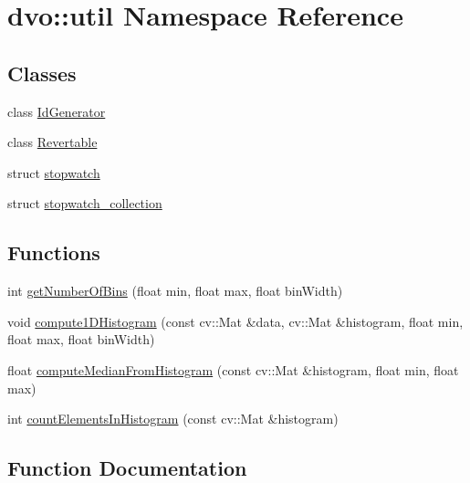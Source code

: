 \hypertarget{namespacedvo_1_1util}{}\section{dvo\+:\+:util Namespace Reference}
\label{namespacedvo_1_1util}
\subsection*{Classes}
\begin{DoxyCompactItemize}
\item 
class \mbox{\hyperlink{classdvo_1_1util_1_1_id_generator}{Id\+Generator}}
\item 
class \mbox{\hyperlink{classdvo_1_1util_1_1_revertable}{Revertable}}
\item 
struct \mbox{\hyperlink{structdvo_1_1util_1_1stopwatch}{stopwatch}}
\item 
struct \mbox{\hyperlink{structdvo_1_1util_1_1stopwatch__collection}{stopwatch\+\_\+collection}}
\end{DoxyCompactItemize}
\subsection*{Functions}
\begin{DoxyCompactItemize}
\item 
int \mbox{\hyperlink{namespacedvo_1_1util_a3523b38b32b8f623b5aeff6e7c4339cb}{get\+Number\+Of\+Bins}} (float min, float max, float bin\+Width)
\item 
void \mbox{\hyperlink{namespacedvo_1_1util_a5a690206d2cdf3f54db9e991cfebb1c1}{compute1\+D\+Histogram}} (const cv\+::\+Mat \&data, cv\+::\+Mat \&histogram, float min, float max, float bin\+Width)
\item 
float \mbox{\hyperlink{namespacedvo_1_1util_af0fef1368b12563b7e623482aef1725a}{compute\+Median\+From\+Histogram}} (const cv\+::\+Mat \&histogram, float min, float max)
\item 
int \mbox{\hyperlink{namespacedvo_1_1util_a1978d9c686a6ed8e7d373bd922b58deb}{count\+Elements\+In\+Histogram}} (const cv\+::\+Mat \&histogram)
\end{DoxyCompactItemize}


\subsection{Function Documentation}
\mbox{\label{namespacedvo_1_1util_a5a690206d2cdf3f54db9e991cfebb1c1}} 
